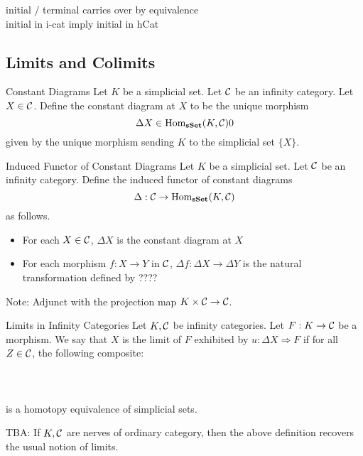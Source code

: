 \documentclass[a4paper]{article}
\begin{document}
initial / terminal carries over by equivalence\\

initial in i-cat imply initial in hCat

\subsection{Limits and Colimits}
\begin{defn}{Constant Diagrams}{} Let $K$ be a simplicial set. Let $\mathcal{C}$ be an infinity category. Let $X\in\mathcal{C}$. Define the constant diagram at $X$ to be the unique morphism $$\Delta X\in\operatorname{Hom}_\bold{sSet}(K,\mathcal{C})0$$ given by the unique morphism sending $K$ to the simplicial set $\{X\}$. 
\end{defn}

\begin{defn}{Induced Functor of Constant Diagrams}{} Let $K$ be a simplicial set. Let $\mathcal{C}$ be an infinity category. Define the induced functor of constant diagrams $$\Delta:\mathcal{C}\to\operatorname{Hom}_\bold{sSet}(K,\mathcal{C})$$ as follows. 
\begin{itemize}
\item For each $X\in\mathcal{C}$, $\Delta X$ is the constant diagram at $X$
\item For each morphism $f:X\to Y$ in $\mathcal{C}$, $\Delta f:\Delta X\to\Delta Y$ is the natural transformation defined by ????
\end{itemize}
\end{defn}

Note: Adjunct with the projection map $K\times\mathcal{C}\to\mathcal{C}$. 

\begin{defn}{Limits in Infinity Categories}{} Let $K,\mathcal{C}$ be infinity categories. Let $F:K\to\mathcal{C}$ be a morphism. We say that $X$ is the limit of $F$ exhibited by $u:\Delta X\Rightarrow F$ if for all $Z\in\mathcal{C}$, the following composite: \\~\\
\\~\\
is a homotopy equivalence of simplicial sets. 
\end{defn}

TBA: If $K,\mathcal{C}$ are nerves of ordinary category, then the above definition recovers the usual notion of limits. 
\end{document}
